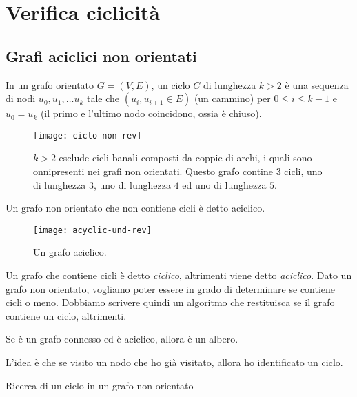 \section{Verifica ciclicità}

\subsection*{Grafi aciclici non orientati}

\begin{definition}
In un grafo orientato \(G = (V, E)\), un ciclo \(C\) di lunghezza \(k > 2\) è una sequenza di nodi \(u_0, u_1, \dots u_k\) tale che \((u_i, u_{i+1} \in E)\) (un cammino) per \(0 \leqslant i \leqslant k-1\) e \(u_0 = u_k\) (il primo e l'ultimo nodo coincidono, ossia è chiuso).
\end{definition}

\begin{figure}[H]
	\centering
	\texttt{[image: ciclo-non-rev]}
	\caption[]{\(k > 2\) esclude cicli banali composti da coppie di archi, i quali sono onnipresenti nei grafi non orientati.
	Questo grafo contine \(3\) cicli, uno di lunghezza \(3\), uno di lunghezza \(4\) ed uno di lunghezza \(5\).}
\end{figure}

\begin{definition}
Un grafo non orientato che non contiene cicli è detto aciclico.
\end{definition}

\begin{figure}[H]
	\centering
	\texttt{[image: acyclic-und-rev]}
	\caption{Un grafo aciclico.}
\end{figure}

Un grafo che contiene cicli è detto \emph{ciclico}, altrimenti viene detto \emph{aciclico}.
Dato un grafo non orientato, vogliamo poter essere in grado di determinare se contiene cicli o meno.
Dobbiamo scrivere quindi un algoritmo che restituisca \True se il grafo contiene un ciclo, \False altrimenti.

\begin{note}
Se è un grafo connesso ed è aciclico, allora è un albero.
\end{note}

L'idea è che se visito un nodo che ho già visitato, allora ho identificato un ciclo.

\clearpage
\begin{algorithm}[H]
	\caption{Ricerca di un ciclo in un grafo non orientato}
	
	
\end{algorithm}

